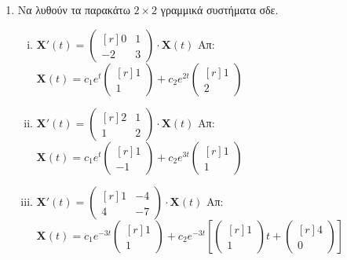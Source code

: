 






\begin{center}
\end{center}

\vspace{\baselineskip}


\begin{enumerate}

	\item Να λυθούν τα παρακάτω $ 2 \times 2 $ γραμμικά συστήματα σδε.

		\begin{enumerate}[i)]

			\item $ \mathbf{X}'(t) = 
				\begin{pmatrix*}[r]
					0 & 1 \\
					-2 & 3
				\end{pmatrix*} \cdot 
				\mathbf{X}(t) $
				\hfill Απ: {\scriptsize $ \mathbf{X}(t) = c_{1}e^{t} 
				\begin{pmatrix*}[r] 1 \\ 1 \end{pmatrix*} + c_{2}e^{2t} 
			\begin{pmatrix*}[r] 1 \\ 2 \end{pmatrix*} $} 

			\item $ \mathbf{X}'(t) = 
				\begin{pmatrix*}[r]
					2 & 1 \\
					1 & 2
				\end{pmatrix*} \cdot 
				\mathbf{X}(t) $
				\hfill Απ: {\scriptsize $ \mathbf{X}(t) = c_{1}e^{t} 
				\begin{pmatrix*}[r] 1 \\ -1 \end{pmatrix*} + c_{2}e^{3t} 
			\begin{pmatrix*}[r] 1 \\ 1 \end{pmatrix*} $} 

		\item $ \mathbf{X}'(t) = 
			\begin{pmatrix*}[r]
				1 & -4 \\
				4 & -7
			\end{pmatrix*} \cdot
			\mathbf{X}(t) $ 
			\hfill Απ: {\scriptsize $ \mathbf{X}(t) = c_{1}e^{-3t} 
			\begin{pmatrix*}[r] 1 \\ 1 \end{pmatrix*} + c_{2}e^{-3t} \left[
			\begin{pmatrix*}[r] 1 \\ 1 \end{pmatrix*} t + 
	\begin{pmatrix*}[r] 4 \\ 0 \end{pmatrix*}  \right] $}


\end{enumerate}
\end{enumerate}
